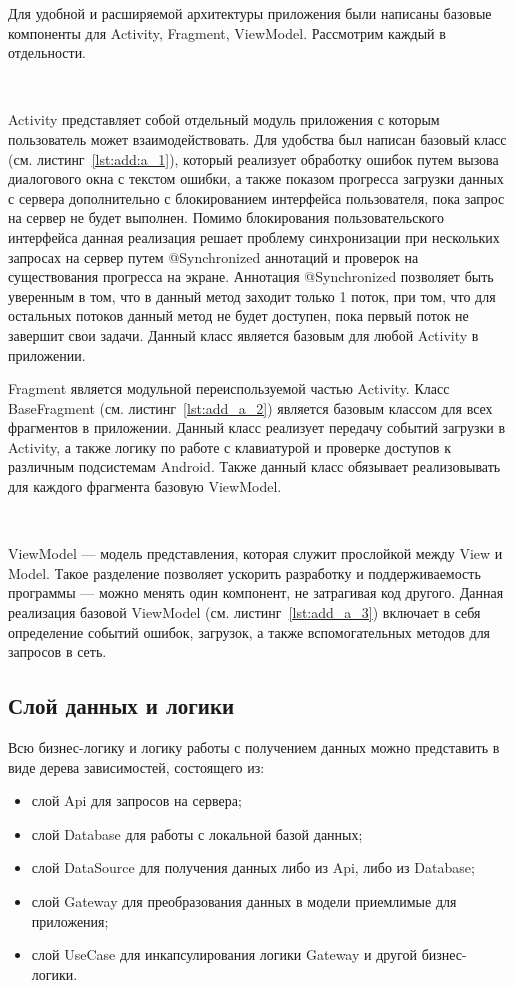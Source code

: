 Для удобной и расширяемой архитектуры приложения были написаны базовые компоненты для Activity, Fragment, ViewModel. Рассмотрим каждый в отдельности.

~\par
Activity представляет собой отдельный модуль приложения с которым пользователь может взаимодействовать. Для удобства был написан базовый класс (см. листинг~\ref{lst:add:a_1}), который реализует обработку ошибок путем вызова диалогового окна с текстом ошибки, а также показом прогресса загрузки данных с сервера дополнительно с блокированием интерфейса пользователя, пока запрос на сервер не будет выполнен. Помимо блокирования пользовательского интерфейса данная реализация решает проблему синхронизации при нескольких запросах на сервер путем @Synchronized аннотаций и проверок на существования прогресса на экране. Аннотация @Synchronized позволяет быть уверенным в том, что в данный метод заходит только 1 поток, при том, что для остальных потоков данный метод не будет доступен, пока первый поток не завершит свои задачи. Данный класс является базовым для любой Activity в приложении.
~\par
Fragment является модульной переиспользуемой частью Activity. Класс BaseFragment (см. листинг~\ref{lst:add_a_2}) является базовым классом для всех фрагментов в приложении. Данный класс реализует передачу событий загрузки в Activity, а также логику по работе с клавиатурой и проверке доступов к различным подсистемам Android. Также данный класс обязывает реализовывать для каждого фрагмента базовую ViewModel.

~\par
ViewModel — модель представления, которая служит прослойкой между View и Model. Такое разделение позволяет ускорить разработку и поддерживаемость программы — можно менять один компонент, не затрагивая код другого. Данная реализация базовой ViewModel (см. листинг~\ref{lst:add_a_3}) включает в себя определение событий ошибок, загрузок, а также вспомогательных методов для запросов в сеть.

\subsection{Слой данных и логики}
Всю бизнес-логику и логику работы с получением данных можно представить в виде дерева зависимостей, состоящего из:

\begin{itemize}
  \item слой Api для запросов на сервера;
  \item слой Database для работы с локальной базой данных;
  \item слой DataSource для получения данных либо из Api, либо из Database;
  \item слой Gateway для преобразования данных в модели приемлимые для приложения;
  \item слой UseCase для инкапсулирования логики Gateway и другой бизнес-логики.
\end{itemize}


